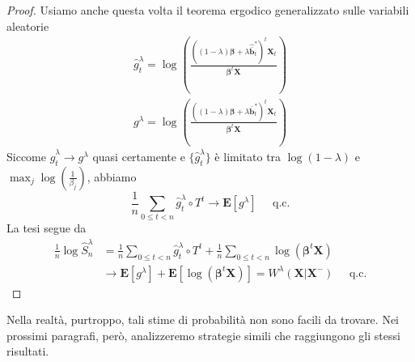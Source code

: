 \documentclass[a4paper,11pt]{book}
\theoremstyle{plain}
\theoremstyle{definition}
\theoremstyle{remark}
\newcommand{\X}{\bm{X}}
\newcommand{\B}{\bm{b}}
\newcommand{\E}{\mathbf{E}}
\newcommand{\Sh}{\hat{S}}
\begin{document}
\begin{proof}
	Usiamo anche questa volta il teorema ergodico generalizzato sulle variabili aleatorie
	\begin{align*}
		\hat{g}_t^\lambda =\log\left(\frac{((1-\lambda)\bm{\beta}+\lambda\hat{\bar{\B}}^{*}_t)^t\X_t}{\bm{\beta}^t\X}\right)\\
		g^\lambda =\log\left(\frac{((1-\lambda)\bm{\beta}+\lambda\bar{\B}^{*}_t)^t\X_t}{\bm{\beta}^t\X}\right)
	\end{align*}
	Siccome $\hat{g}_t^\lambda\rightarrow g^\lambda$ quasi certamente e $\{\hat{g}_t^\lambda\}$ è limitato tra $\log(1-\lambda)$ e $\max_j\log\left(\frac{1}{\beta_j}\right)$, abbiamo
	\begin{equation*}
		\frac{1}{n}\sum_{0\leq t<n}{\hat{g}^\lambda_t\circ T^t}\rightarrow \E[g^\lambda] \;\;\;\;\; \text{q.c.}
	\end{equation*}
	La tesi segue da 
	\begin{equation*}
		\begin{split}
		\frac{1}{n}\log\Sh_n^\lambda & = \frac{1}{n}\sum_{0\leq t<n}{\hat{g}^\lambda_t\circ T^t}+\frac{1}{n}\sum_{0\leq t<n}{\log(\bm{\beta}^t\X)}\\
		& \rightarrow \E[g^\lambda]+\E[\log(\bm{\beta}^t\X)] = W^\lambda(\X|\X^-) \;\;\;\;\; \text{q.c.}
		\end{split}
	\end{equation*}
\end{proof}
Nella realtà, purtroppo, tali stime di probabilità non sono facili da trovare. Nei prossimi paragrafi, però, analizzeremo strategie simili che raggiungono gli stessi risultati.
\end{document}
